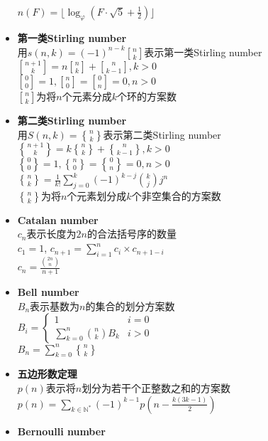 \begin{itemize}
        \\$ n(F) = \lfloor \log_\varphi(F \cdot \sqrt{5} + \frac{1}{2}) \rfloor $
    \item \textbf{第一类Stirling number}
        \\用$ s(n, k) = (-1) ^ {n - k} {n \brack k} $表示第一类Stirling number
        \\$ {n + 1 \brack k} = n {n \brack k} + {n \brack k - 1}, k > 0 $
        \\$ {0 \brack 0} = 1, {n \brack 0} = {0 \brack n} = 0, n > 0 $
        \\$ {n \brack k} $为将$ n $个元素分成$ k $个环的方案数
    \item \textbf{第二类Stirling number}
        \\用$ S(n, k) = {n \brace k} $表示第二类Stirling number
        \\$ {n + 1 \brace k} = k {n \brace k} + {n \brace k - 1}, k > 0 $
        \\$ {0 \brace 0} = 1, {n \brace 0} = {0 \brace n} = 0, n > 0 $
        \\$ {n \brace k} = \frac{1}{k!} \sum\limits_{j = 0}^{k} (-1) ^ {k - j} \binom{k}{j} j ^ n $
        \\$ {n \brace k} $为将$ n $个元素划分成$ k $个非空集合的方案数
    \item \textbf{Catalan number}
        \\$ c_n $表示长度为$ 2n $的合法括号序的数量
        \\$ c_1 = 1 $, $ c_{n+1} = \sum\limits_{i=1}^{n} c_i \times c_{n + 1 - i} $
        \\$ c_n = \frac{\binom{2n}{n}}{n + 1} $
    \item \textbf{Bell number}
        \\$ B_n $表示基数为$ n $的集合的划分方案数
        \\$ B_i = \begin{cases}
            1 & i = 0\\
            \sum\limits_{k = 0}^{n} \binom{n}{k} B_k & i > 0
        \end{cases} $
        \\$ B_n = \sum\limits_{k = 0}^{n} {n \brace k} $
    \item \textbf{五边形数定理}
        \\$ p(n) $表示将$ n $划分为若干个正整数之和的方案数
        \\$ p(n) = \sum\limits_{k \in \mathbb{N}^\ast} (-1)^{k - 1} p(n - \frac{k(3k - 1)}{2}) $
    \item \textbf{Bernoulli number}

\end{itemize}
